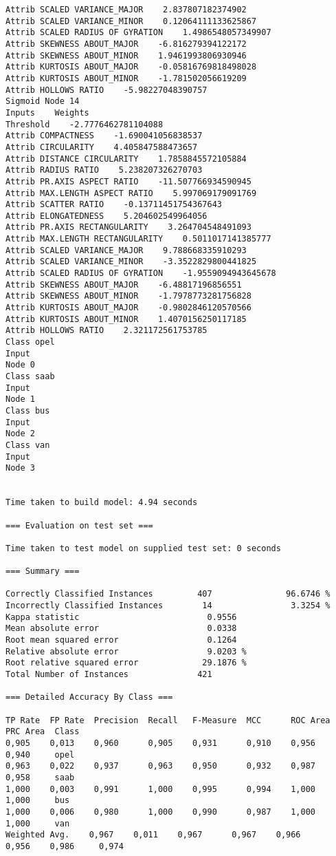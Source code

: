 \documentclass[
	article,			%
	11pt,				%
	oneside,			%
	a4paper,			%
	english,			%
	brazil,				%
	sumario=tradicional
	]{abntex2}
\begin{document}
\begin{lstlisting}
Attrib SCALED VARIANCE_MAJOR    2.837807182374902
Attrib SCALED VARIANCE_MINOR    0.12064111133625867
Attrib SCALED RADIUS OF GYRATION    1.4986548057349907
Attrib SKEWNESS ABOUT_MAJOR    -6.816279394122172
Attrib SKEWNESS ABOUT_MINOR    1.9461993806930946
Attrib KURTOSIS ABOUT_MAJOR    -0.05816769818498028
Attrib KURTOSIS ABOUT_MINOR    -1.781502056619209
Attrib HOLLOWS RATIO    -5.98227048390757
Sigmoid Node 14
Inputs    Weights
Threshold    -2.7776462781104088
Attrib COMPACTNESS    -1.690041056838537
Attrib CIRCULARITY    4.405847588473657
Attrib DISTANCE CIRCULARITY    1.7858845572105884
Attrib RADIUS RATIO    5.238207326270703
Attrib PR.AXIS ASPECT RATIO    -11.507766934590945
Attrib MAX.LENGTH ASPECT RATIO    5.997069179091769
Attrib SCATTER RATIO    -0.13711451754367643
Attrib ELONGATEDNESS    5.204602549964056
Attrib PR.AXIS RECTANGULARITY    3.264704548491093
Attrib MAX.LENGTH RECTANGULARITY    0.5011017141385777
Attrib SCALED VARIANCE_MAJOR    9.788668335910293
Attrib SCALED VARIANCE_MINOR    -3.3522829800441825
Attrib SCALED RADIUS OF GYRATION    -1.9559094943645678
Attrib SKEWNESS ABOUT_MAJOR    -6.48817196856551
Attrib SKEWNESS ABOUT_MINOR    -1.7978773281756828
Attrib KURTOSIS ABOUT_MAJOR    -0.9802846120570566
Attrib KURTOSIS ABOUT_MINOR    1.4070156250117185
Attrib HOLLOWS RATIO    2.321172561753785
Class opel
Input
Node 0
Class saab
Input
Node 1
Class bus
Input
Node 2
Class van
Input
Node 3


Time taken to build model: 4.94 seconds

=== Evaluation on test set ===

Time taken to test model on supplied test set: 0 seconds

=== Summary ===

Correctly Classified Instances         407               96.6746 %
Incorrectly Classified Instances        14                3.3254 %
Kappa statistic                          0.9556
Mean absolute error                      0.0338
Root mean squared error                  0.1264
Relative absolute error                  9.0203 %
Root relative squared error             29.1876 %
Total Number of Instances              421     

=== Detailed Accuracy By Class ===

TP Rate  FP Rate  Precision  Recall   F-Measure  MCC      ROC Area  PRC Area  Class
0,905    0,013    0,960      0,905    0,931      0,910    0,956     0,940     opel
0,963    0,022    0,937      0,963    0,950      0,932    0,987     0,958     saab
1,000    0,003    0,991      1,000    0,995      0,994    1,000     1,000     bus
1,000    0,006    0,980      1,000    0,990      0,987    1,000     1,000     van
Weighted Avg.    0,967    0,011    0,967      0,967    0,966      0,956    0,986     0,974     


\end{lstlisting}
\end{document}
